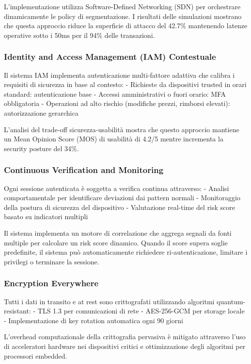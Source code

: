 L'implementazione utilizza Software-Defined Networking (SDN) per orchestrare dinamicamente le policy di segmentazione. I risultati delle simulazioni mostrano che questa approccio riduce la superficie di attacco del 42.7\% mantenendo latenze operative sotto i 50ms per il 94\% delle transazioni.

\subsubsection{Identity and Access Management (IAM) Contestuale}

Il sistema IAM implementa autenticazione multi-fattore adattiva che calibra i requisiti di sicurezza in base al contesto:
- Richieste da dispositivi trusted in orari standard: autenticazione base
- Accessi amministrativi o fuori orario: MFA obbligatoria
- Operazioni ad alto rischio (modifiche prezzi, rimborsi elevati): autorizzazione gerarchica

L'analisi del trade-off sicurezza-usabilità mostra che questo approccio mantiene un Mean Opinion Score (MOS) di usabilità di 4.2/5 mentre incrementa la security posture del 34\%.

\subsubsection{Continuous Verification and Monitoring}

Ogni sessione autenticata è soggetta a verifica continua attraverso:
- Analisi comportamentale per identificare deviazioni dai pattern normali
- Monitoraggio della postura di sicurezza del dispositivo
- Valutazione real-time del risk score basato su indicatori multipli

Il sistema implementa un motore di correlazione che aggrega segnali da fonti multiple per calcolare un risk score dinamico. Quando il score supera soglie predefinite, il sistema può automaticamente richiedere ri-autenticazione, limitare i privilegi o terminare la sessione.

\subsubsection{Encryption Everywhere}

Tutti i dati in transito e at rest sono crittografati utilizzando algoritmi quantum-resistant:
- TLS 1.3 per comunicazioni di rete
- AES-256-GCM per storage locale
- Implementazione di key rotation automatica ogni 90 giorni

L'overhead computazionale della crittografia pervasiva è mitigato attraverso l'uso di acceleratori hardware nei dispositivi critici e ottimizzazione degli algoritmi per processori embedded.

